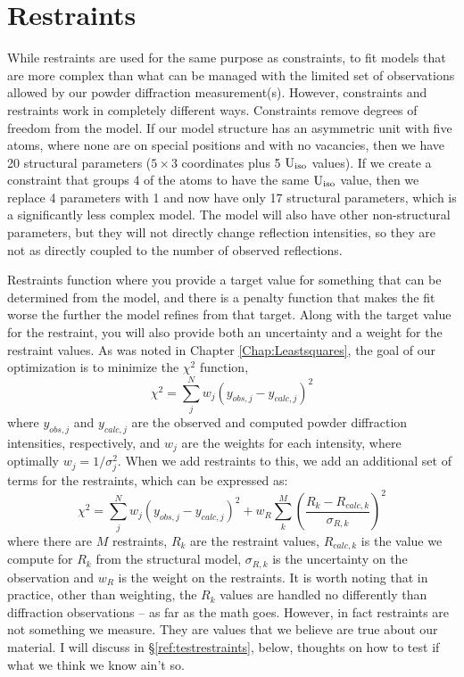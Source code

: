 \chapter{Restraints}\label{Chap:restraints}

While restraints are used for the same purpose as constraints, to fit models that are more complex than what can be managed with the limited set of observations allowed by our powder diffraction measurement(s). However, constraints and restraints work in completely different ways. Constraints remove degrees of freedom from the model. If our model structure has an asymmetric unit with five atoms, where none are on special positions and with no vacancies, then we have 20 structural parameters ($5\times 3$ coordinates plus 5  $\rm U_{iso}$ values). If we create a constraint that groups 4 of the atoms to have the same $\rm U_{iso}$ value, then we replace 4 parameters with 1 and now have only 17 structural parameters, which is a significantly less complex model. The model will also have other non-structural parameters, but they will not directly change reflection intensities, so they are not as directly coupled to the number of observed reflections. 

Restraints function where you provide a target value for something that can be determined from the model, and there is a penalty function that makes the fit worse the further the model refines from that target. Along with the target value for the restraint, you will also provide both an uncertainty and a weight for the restraint values. As was noted in Chapter \ref{Chap:Leastsquares}, the goal of our optimization is to minimize the $\chi^2$ function, 
$$\chi^2 = \sum_j^N w_j(y_{obs,j}-y_{calc,j})^2$$
where $y_{obs,j}$ and $y_{calc,j}$ are the observed and computed powder diffraction intensities, respectively, and $w_j$ are the weights for each intensity, where optimally $w_j = 1/\sigma_j^2$. When we add restraints to this, we add an additional set of terms for the restraints, which can be expressed as:
$$\chi^2 = \sum_j^N w_j(y_{obs,j}-y_{calc,j})^2 + w_{R} \sum_k^M  \left ( \frac{R_k - R_{calc,k}}{\sigma_{R,k}}\right)^2$$
where there are $M$ restraints, $R_k$ are the restraint values, $R_{calc,k}$ is the value we compute for $R_{k}$  from the structural model, $\sigma_{R,k}$ is the uncertainty on the observation and $w_{R}$ is the weight on the restraints. It is worth noting that in practice, other than weighting, the $R_k$ values are handled no differently than diffraction observations -- as far as the math goes. However, in fact restraints are not something we measure. They are values that we believe are true about our material. I will discuss in \S\ref{ref:testrestraints}, below, thoughts on how to test if what we think we know ain't so. 

